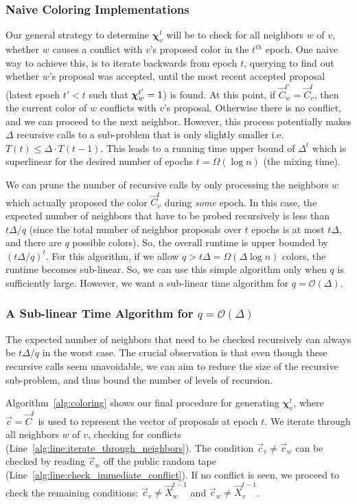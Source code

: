 \subsubsection{Naive Coloring Implementations}%
\label{sec:naive_coloring_implementations}
Our general strategy to determine $\bm\chi^t_v$ will be to check for all neighbors $w$ of $v$,
whether $w$ causes a conflict with $v$'s proposed color in the $t^{th}$ epoch.
One naive way to achieve this, is to iterate backwards from epoch $t$, querying to find out whether $w$'s proposal was accepted,
until the most recent accepted proposal (latest epoch $t' < t$ such that $\bm\chi^{t'}_w=\mathsf{1}$) is found.
At this point, if $\vec C^{t'}_w =\vec C^t_v$, then the current color of $w$ conflicts with $v$'s proposal.
Otherwise there is no conflict, and we can proceed to the next neighbor.
However, this process potentially makes $\Delta$ recursive calls to a sub-problem that is only slightly smaller i.e. $T(t) \le \Delta\cdot T(t-1)$.
This leads to a running time upper bound of $\Delta^{t}$ which is superlinear for the desired number of epochs $t = \Omega(\log n)$ (the mixing time).

We can prune the number of recursive calls by only processing the neighbors $w$ which actually proposed the color $\vec C^t_v$ during \emph{some} epoch.
In this case, the expected number of neighbors that have to be probed recursively is less than $t\Delta/q$
(since the total number of neighbor proposals over $t$ epochs is at most $t\Delta$, and there are $q$ possible colors).
So, the overall runtime is upper bounded by $(t\Delta/q)^{t}$.
For this algorithm, if we allow $q > t\Delta = \Omega(\Delta\log n)$ colors, the runtime becomes sub-linear.
So, we can use this simple algorithm only when $q$ is sufficiently large.
However, we want a sub-linear time algorithm for $q = \mathcal O(\Delta)$.


\subsubsection{A Sub-linear Time Algorithm for $q = \mathcal O(\Delta)$}
\label{sec:jumping_back_to_past_epochs}
The expected number of neighbors that need to be checked recursively can always be $t\Delta/q$ in the worst case.
The crucial observation is that even though these recursive calls seem unavoidable,
we can aim to reduce the size of the recursive sub-problem, and thus bound the number of levels of recursion.

Algorithm~\ref{alg:coloring} shows our final procedure for generating $\bm\chi^t_v$,
where $\vec c = \vec C^t$ is used to represent the vector of proposals at epoch $t$.
We iterate through all neighbors $w$ of $v$, checking for conflicts (Line~\ref{alg:line:iterate_through_neighbors}).
The condition $\vec c_v\not=\vec c_w$ can be checked by reading $\vec c_w$ off the public random tape (Line~\ref{alg:line:check_immediate_conflict}).
If no conflict is seen, we proceed to check the remaining conditions: $\vec c_v\not= \vec X^{t-1}_w$ and $\vec c_w\not= \vec X^{t-1}_v$.

